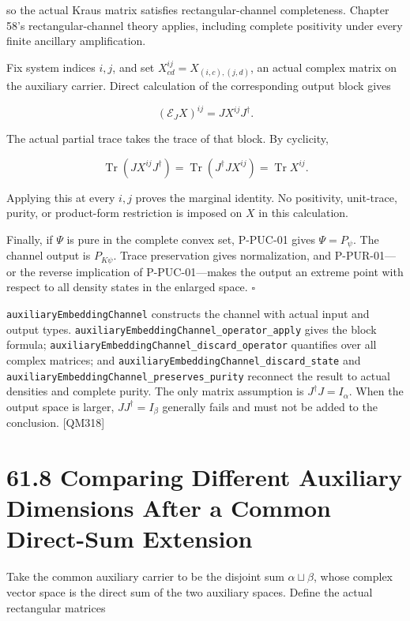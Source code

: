 \documentclass[
  11pt,
  oneside]{book}
\begin{document}
so the actual Kraus matrix satisfies rectangular-channel completeness.
Chapter 58's rectangular-channel theory applies, including complete
positivity under every finite ancillary amplification.

Fix system indices \(i,j\), and set \(X^{ij}_{cd}=X_{(i,c),(j,d)}\), an
actual complex matrix on the auxiliary carrier. Direct calculation of
the corresponding output block gives

\[
(\mathcal E_JX)^{ij}=JX^{ij}J^\dagger.
\]

The actual partial trace takes the trace of that block. By cyclicity,

\[
\operatorname{Tr}(JX^{ij}J^\dagger)
=\operatorname{Tr}(J^\dagger JX^{ij})
=\operatorname{Tr}X^{ij}.
\]

Applying this at every \(i,j\) proves the marginal identity. No
positivity, unit-trace, purity, or product-form restriction is imposed
on \(X\) in this calculation.

Finally, if \(\Psi\) is pure in the complete convex set, P-PUC-01 gives
\(\Psi=P_\psi\). The channel output is \(P_{K\psi}\). Trace preservation
gives normalization, and P-PUR-01---or the reverse implication of
P-PUC-01---makes the output an extreme point with respect to all density
states in the enlarged space. \(\square\)

\texttt{auxiliary\allowbreak Embedding\allowbreak Channel} constructs the channel with actual
input and output types.
\texttt{auxiliary\allowbreak Embedding\allowbreak Channel\_\allowbreak operator\_\allowbreak apply} gives the block
formula; \texttt{auxiliary\allowbreak Embedding\allowbreak Channel\_\allowbreak discard\_\allowbreak operator}
quantifies over all complex matrices; and
\texttt{auxiliary\allowbreak Embedding\allowbreak Channel\_\allowbreak discard\_\allowbreak state} and
\texttt{auxiliary\allowbreak Embedding\allowbreak Channel\_\allowbreak preserves\_\allowbreak purity} reconnect the
result to actual densities and complete purity. The only matrix
assumption is \(J^\dagger J=I_\alpha\). When the output space is larger,
\(JJ^\dagger=I_\beta\) generally fails and must not be added to the
conclusion. {[}QM318{]}

\section{61.8 Comparing Different Auxiliary Dimensions After a Common
Direct-Sum Extension}

Take the common auxiliary carrier to be the disjoint sum
\(\alpha\sqcup\beta\), whose complex vector space is the direct sum of
the two auxiliary spaces. Define the actual rectangular matrices
\end{document}
